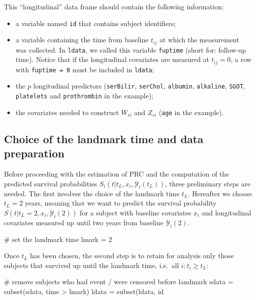 This ``longitudinal'' data frame should contain the following
information:

\begin{itemize}
\item
  a variable named \texttt{id} that contains subject identifiers;
\item
  a variable containing the time from baseline \(t_{ij}\) at which the
  measurement was collected. In \texttt{ldata}, we called this variable
  \texttt{fuptime} (short for: follow-up time). Notice that if the
  longitudinal covariates are measured at \(t_{ij} = 0\), a row with
  \texttt{fuptime\ =\ 0} must be included in \texttt{ldata};
\item
  the \(p\) longitudinal predictors (\texttt{serBilir},
  \texttt{serChol}, \texttt{albumin}, \texttt{alkaline}, \texttt{SGOT},
  \texttt{platelets} and \texttt{prothrombin} in the example);
\item
  the covariates needed to construct \(W_{si}\) and \(Z_{si}\)
  (\texttt{age} in the example).
\end{itemize}

\subsection{Choice of the landmark time and data
preparation}\label{choice-of-the-landmark-time-and-data-preparation}

Before proceeding with the estimation of PRC and the computation of the
predicted survival probabilities
\(S_i(t | t_L, x_i, \mathcal{Y}_i(t_L))\), three preliminary steps are
needed. The first involves the choice of the landmark time \(t_L\).
Hereafter we choose \(t_L = 2\) years, meaning that we want to predict
the survival probability \(S(t | t_L = 2, x_i, \mathcal{Y}_i(2))\) for a
subject with baseline covariates \(x_i\) and longitudinal covariates
measured up until two years from baseline \(\mathcal{Y}_i(2)\).

\begin{Schunk}
\begin{Sinput}
# set the landmark time
lmark = 2
\end{Sinput}
\end{Schunk}

Once \(t_L\) has been chosen, the second step is to retain for analysis
only those subjects that survived up until the landmark time, i.e.~all
\(i: t_i \geq t_L\):

\begin{Schunk}
\begin{Sinput}
# remove subjects who had event / were censored before landmark
sdata = subset(sdata, time > lmark)
ldata = subset(ldata, id %
\end{Sinput}
\end{Schunk}

